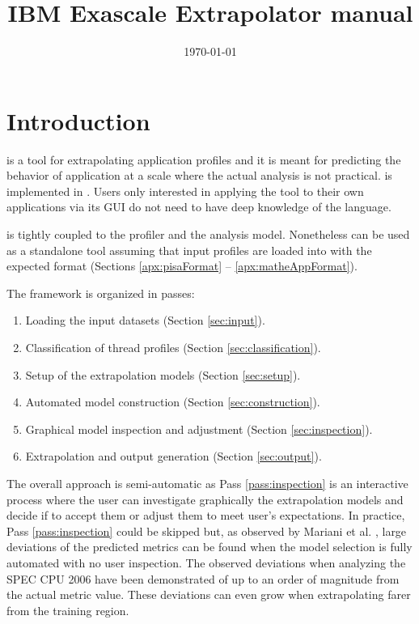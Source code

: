 \documentclass[a4paper, 10pt]{article}
\title{IBM Exascale Extrapolator manual}
\date{\today}
\begin{document}
\maketitle

\tableofcontents

\section{Introduction}
\label{sec:intro}
\ex is a tool for extrapolating application profiles and it is meant for predicting the behavior of application
at a scale where the actual analysis is not practical. \ex is implemented in \mathe. Users only interested in
applying the \ex tool to their own applications via its GUI do not need to have deep knowledge of the \mathe language.

\ex is tightly coupled to the \pisa profiler and the \eb analysis model. Nonetheless \ex can be used as a standalone tool
assuming that input profiles are loaded into \mathe with the expected format (Sections \ref{apx:pisaFormat} -- \ref{apx:matheAppFormat}).



The \ex framework is organized in passes:
\begin{enumerate}
 \item Loading the input datasets (Section \ref{sec:input}).
 \item Classification of thread profiles (Section \ref{sec:classification}).
 \item Setup of the extrapolation models (Section \ref{sec:setup}).
 \item Automated model construction (Section \ref{sec:construction}).
 \item Graphical model inspection and adjustment (Section \ref{sec:inspection}).\label{pass:inspection}
 \item Extrapolation and output generation (Section \ref{sec:output}).
\end{enumerate}

The overall approach is semi-automatic as Pass \ref{pass:inspection} is an interactive process where the user can
investigate graphically the extrapolation models and decide if to accept them or adjust them to meet user's expectations.
In practice, Pass \ref{pass:inspection} could be skipped but, as observed by Mariani et al. \cite{mariani2015cf}, large deviations
of the predicted metrics can be found when the model selection is fully automated with no user inspection. The
observed deviations when analyzing the SPEC CPU 2006 have been demonstrated of up to an order of magnitude from the actual
metric value. These deviations can even grow when extrapolating farer from the
training region.
\end{document}
